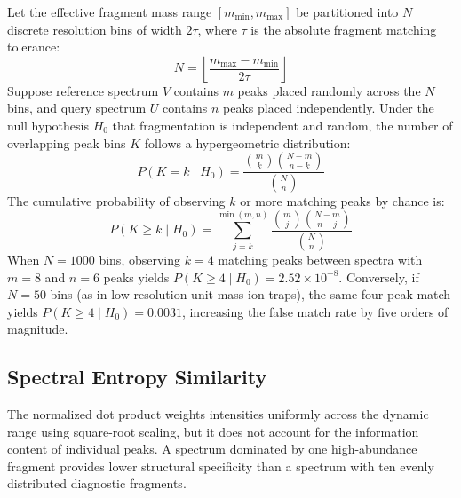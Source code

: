 \documentclass[11pt,twoside,openright]{book}
\begin{document}
Let the effective fragment mass range $[m_{\min}, m_{\max}]$ be partitioned into $N$ discrete resolution bins of width $2\tau$, where $\tau$ is the absolute fragment matching tolerance:
\begin{equation}
N = \left\lfloor \frac{m_{\max} - m_{\min}}{2\tau} \right\rfloor
\label{eq:mass_bins}
\end{equation}
Suppose reference spectrum $V$ contains $m$ peaks placed randomly across the $N$ bins, and query spectrum $U$ contains $n$ peaks placed independently. Under the null hypothesis $H_0$ that fragmentation is independent and random, the number of overlapping peak bins $K$ follows a hypergeometric distribution:
\begin{equation}
P(K = k \mid H_0) = \frac{\binom{m}{k} \binom{N - m}{n - k}}{\binom{N}{n}}
\label{eq:hypergeometric_null}
\end{equation}
The cumulative probability of observing $k$ or more matching peaks by chance is:
\begin{equation}
P(K \ge k \mid H_0) = \sum_{j=k}^{\min(m, n)} \frac{\binom{m}{j} \binom{N - m}{n - j}}{\binom{N}{n}}
\label{eq:hyper_pvalue}
\end{equation}
When $N = 1000$ bins, observing $k = 4$ matching peaks between spectra with $m = 8$ and $n = 6$ peaks yields $P(K \ge 4 \mid H_0) = 2.52 \times 10^{-8}$. Conversely, if $N = 50$ bins (as in low-resolution unit-mass ion traps), the same four-peak match yields $P(K \ge 4 \mid H_0) = 0.0031$, increasing the false match rate by five orders of magnitude.

\subsection{Spectral Entropy Similarity}
The normalized dot product weights intensities uniformly across the dynamic range using square-root scaling, but it does not account for the information content of individual peaks. A spectrum dominated by one high-abundance fragment provides lower structural specificity than a spectrum with ten evenly distributed diagnostic fragments.
\end{document}
